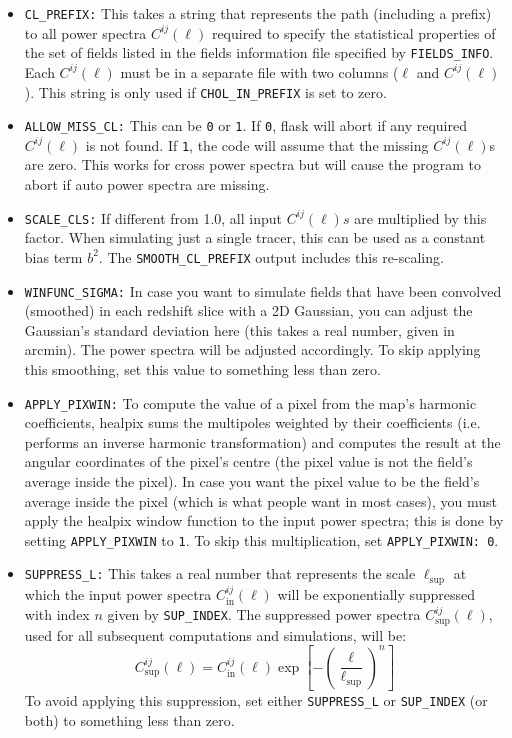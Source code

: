\documentclass[12pt]{book} %
\newcommand{\nv}[1]{\mathrm{#1}}                 %
\begin{document}
\begin{itemize}
\item {\tt CL\_PREFIX:} This takes a string that represents the path (including a prefix) to all 
  power spectra $C^{ij}(\ell)$ required to specify the statistical properties of the set of fields 
  listed in the fields information file specified by {\tt FIELDS\_INFO}. Each $C^{ij}(\ell)$ must 
  be in a separate file with two columns ($\ell$ and $C^{ij}(\ell)$). This string is only used 
  if {\tt CHOL\_IN\_PREFIX} is set to zero.

\item {\tt ALLOW\_MISS\_CL:} This can be {\tt 0} or {\tt 1}. If {\tt 0}, {\sc flask} will abort 
  if any required $C^{ij}(\ell)$ is not found. If {\tt 1}, the code will assume that the missing 
  $C^{ij}(\ell)$s are zero. This works for cross power spectra but will cause the program to abort 
  if auto power spectra are missing.

\item {\tt SCALE\_CLS:} If different from 1.0, all input $C^{ij}(\ell)s$ are multiplied by 
  this factor. When simulating just a single tracer, this can be used as a constant bias term 
  $b^2$. The {\tt SMOOTH\_CL\_PREFIX} output includes this re-scaling.

\item {\tt WINFUNC\_SIGMA:} In case you want to simulate fields that have been convolved 
  (smoothed) in each redshift slice with a 2D Gaussian, you can adjust the Gaussian's standard 
  deviation here (this takes a real number, given in arcmin). The power spectra will be adjusted accordingly. 
  To skip applying this smoothing, set this value to something less than zero.

\item {\tt APPLY\_PIXWIN:} To compute the value of a pixel from the map's harmonic coefficients, 
  {\sc healpix} sums the multipoles weighted by their coefficients (i.e. performs an inverse 
  harmonic transformation) and computes the result at the angular coordinates of the pixel's 
  centre (the pixel value is not the field's average inside the pixel). In case you want the pixel 
  value to be the field's average inside the pixel (which is what people want in most cases), 
  you must apply the {\sc healpix} window function 
  to the input power spectra; this is done by setting {\tt APPLY\_PIXWIN} to {\tt 1}. To skip 
  this multiplication, set {\tt APPLY\_PIXWIN: 0}.

\item {\tt SUPPRESS\_L:} This takes a real number that represents the scale $\ell_{\nv{sup}}$ 
  at which the input power spectra $C_{\nv{in}}^{ij}(\ell)$ will be exponentially suppressed 
  with index $n$ given by {\tt SUP\_INDEX}. The suppressed power spectra $C_{\nv{sup}}^{ij}(\ell)$, 
  used for all subsequent computations and simulations, will be: 
  \begin{equation}
    C_{\nv{sup}}^{ij}(\ell) = C_{\nv{in}}^{ij}(\ell) \exp \left[ - \left(\frac{\ell}{\ell_{\nv{sup}}}\right)^n\right]
    \label{eq:exp-suppress}
  \end{equation}
  To avoid applying this suppression, set either {\tt SUPPRESS\_L} or {\tt SUP\_INDEX} (or both) 
  to something less than zero.


\end{itemize}
\end{document}
